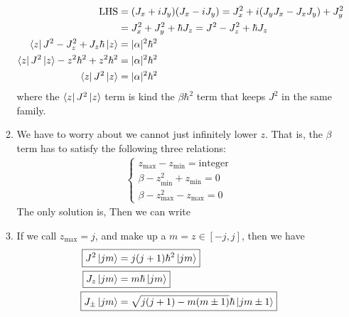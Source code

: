 \documentclass{school-22.101-notes}
\begin{document}
\begin{enumerate}
\begin{enumerate}
\begin{align}
      \mathrm{LHS} &= (J_x + i J_y) (J_x - iJ_y) = J_x^2 + i (J_y J_x - J_x J_y) + J_y^2 \\
      &= J_x^2 + J_y^2 + \hbar J_z = J^2 - J_z^2 + \hbar J_z \\
      \left< z \right| J^2 - J_z^2 + J_z \hbar \left| z \right> &= |\alpha|^2 \hbar^2 \\
      \left< z \right| J^2 \left| z \right> - z^2 \hbar^2 + z^2 \hbar^2 &= |\alpha|^2 \hbar^2 \\
      \left< z \right| J^2 \left| z \right> &= |\alpha|^2 \hbar^2 
    \end{align}
    where the $\left< z \right| J^2 \left| z \right>$ term is kind the $\beta \hbar^2$ term that keeps $J^2$ in the same family. 
  \item We have to worry about we cannot just infinitely lower $z$. That is, the $\beta$ term has to satisfy the following three relations: 
    \begin{align}
      \left\{ \begin{array}{c} 
        z_{\max} - z_{\min} = \mathrm{integer}  \\
        \beta - z_{\min}^2 + z_{\min} = 0 \\
        \beta - z_{\max}^2 - z_{\max} = 0
      \end{array}
      \right. 
    \end{align}
    The only solution is, 
    Then we can write 
  \item If we call $z_{\max} = j$, and make up a $m = z \in [-j, j]$, then we have 
    \begin{align}
      \Aboxed{J^2 \ket{j m} &= j(j+1) \hbar^2 \ket{j m}} \\
      \Aboxed{J_z \ket{j m} &= m\hbar \ket{j m} } \\
      \Aboxed{ J_{\pm} \ket{j m} &= \sqrt{j(j+1) - m(m\pm 1)} \hbar \ket{jm\pm 1} }
    \end{align}


\end{enumerate}
\end{enumerate}
\end{document}
